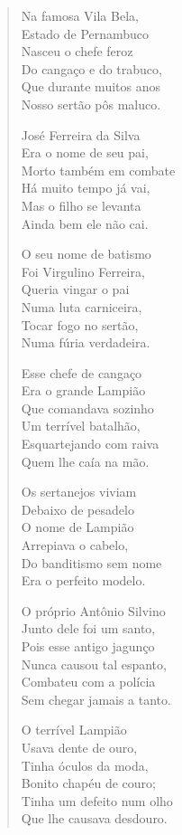 \begin{verse}
Na famosa Vila Bela,\\
Estado de Pernambuco\\
Nasceu o chefe feroz\\
Do cangaço e do trabuco,\\
Que durante muitos anos\\
Nosso sertão pôs maluco.

José Ferreira da Silva\\
Era o nome de seu pai,\\
Morto também em combate\\
Há muito tempo já vai,\\
Mas o filho se levanta\\
Ainda bem ele não cai.

O seu nome de batismo\\
Foi Virgulino Ferreira,\\
Queria vingar o pai\\
Numa luta carniceira,\\
Tocar fogo no sertão,\\
Numa fúria verdadeira.


Esse chefe de cangaço\\
Era o grande Lampião\\
Que comandava sozinho\\
Um terrível batalhão,\\
Esquartejando com raiva\\
Quem lhe caía na mão.

Os sertanejos viviam\\
Debaixo de pesadelo\\
O nome de Lampião\\
Arrepiava o cabelo,\\
Do banditismo sem nome\\
Era o perfeito modelo.

O próprio Antônio Silvino\\
Junto dele foi um santo,\\
Pois esse antigo jagunço \\
Nunca causou tal espanto,\\
Combateu com a polícia\\
Sem chegar jamais a tanto.

O terrível Lampião\\
Usava dente de ouro,\\
Tinha óculos da moda,\\
Bonito chapéu de couro;\\
Tinha um defeito num olho\\
Que lhe causava desdouro.



\end{verse}
